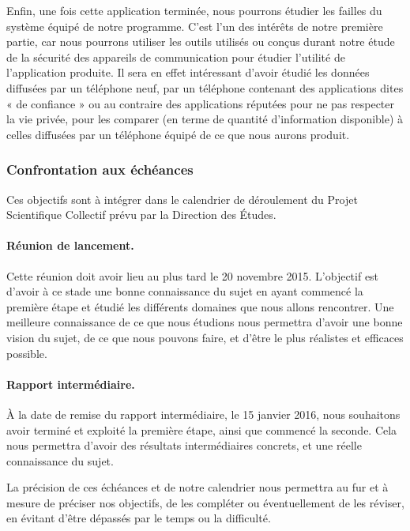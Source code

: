 \documentclass[a4paper, 12pt,twoside]{article}
\begin{document}
		Enfin, une fois cette application terminée, nous pourrons étudier les failles du système équipé de notre programme. C'est l'un des intérêts de notre première partie, car nous pourrons utiliser les outils utilisés ou conçus durant notre étude de la sécurité des appareils de communication pour étudier l'utilité de l'application produite. Il sera en effet intéressant d'avoir étudié les données diffusées par un téléphone neuf, par un téléphone contenant des applications dites «  de confiance  » ou au contraire des applications réputées pour ne pas respecter la vie privée, pour les comparer (en terme de quantité d'information disponible) à celles diffusées par un téléphone équipé de ce que nous aurons produit.
		
		\subsubsection{Confrontation aux échéances}
		
		Ces objectifs sont à intégrer dans le calendrier de déroulement du  Projet Scientifique Collectif prévu par la Direction des Études.
		
		\paragraph{Réunion de lancement. } Cette réunion doit avoir lieu au plus tard le 20 novembre 2015. L'objectif est d'avoir à ce stade une bonne connaissance du sujet en ayant commencé la première étape et étudié les différents domaines que nous allons rencontrer. Une meilleure connaissance de ce que nous étudions nous permettra d'avoir une bonne vision du sujet, de ce que nous pouvons faire, et d'être le plus réalistes et efficaces possible.
		
		\paragraph{Rapport intermédiaire. } À la date de remise du rapport intermédiaire, le 15 janvier 2016, nous souhaitons avoir terminé et exploité la première étape, ainsi que commencé la seconde. Cela nous permettra d'avoir des résultats intermédiaires concrets, et une réelle connaissance du sujet.
		
		La précision de ces échéances et de notre calendrier nous permettra au fur et à mesure de préciser nos objectifs, de les compléter ou éventuellement de les réviser, en évitant d'être dépassés par le temps ou la difficulté.
			
\end{document}
